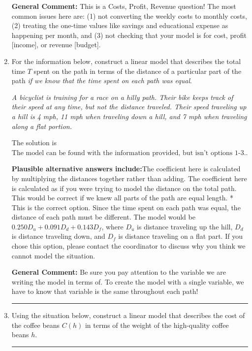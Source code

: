 \documentclass{extbook}[14pt]
\newcommand{\litem}[1]{\item #1

\rule{\textwidth}{0.4pt}}
\begin{document}
\begin{enumerate}
{\textbf{General Comment:} This is a Costs, Profit, Revenue question! The most common issues here are: (1) not converting the weekly costs to monthly costs, (2) treating the one-time values like savings and educational expense as happening per month, and (3) not checking that your model is for cost, profit [income], or revenue [budget].
}
\litem{
For the information below, construct a linear model that describes the total time $T$ spent on the path in terms of the distance of a particular part of the path \textit{if we know that the time spent on each path was equal}.

\begin{center}
    \textit{ A bicyclist is training for a race on a hilly path. Their bike keeps track of their speed at any time, but not the distance traveled. Their speed traveling up a hill is 4 mph, 11 mph when traveling down a hill, and 7 mph when traveling along a flat portion. }
\end{center}
The solution is \( \text{The model can be found with the information provided, but isn't options 1-3.} \).\begin{enumerate}[label=\Alph*.]
\textbf{Plausible alternative answers include:}The coefficient here is calculated by multiplying the distances together rather than adding.
The coefficient here is calculated as if you were trying to model the distance on the total path.
This would be correct if we knew all parts of the path are equal length.
* This is the correct option. Since the time spent on each path was equal, the distance of each path must be different. The model would be $0.250D_u + 0.091D_d + 0.143D_f$, where $D_u$ is distance traveling up the hill, $D_d$ is distance traveling down, and $D_f$ is distance traveling on a flat part.
If you chose this option, please contact the coordinator to discuss why you think we cannot model the situation.
\end{enumerate}

\textbf{General Comment:} Be sure you pay attention to the variable we are writing the model in terms of. To create the model with a single variable, we have to know that variable is the same throughout each path!
}
\litem{
Using the situation below, construct a linear model that describes the cost of the coffee beans $C(h)$ in terms of the weight of the high-quality coffee beans $h$.

}
\end{enumerate}
\end{document}
